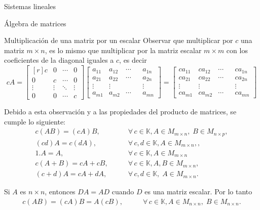 \documentclass[a4paper,12pt,twoside,spanish,reqno]{amsbook}
\theoremstyle{definition}
\theoremstyle{remark}
\newcommand{\K}{\mathbb K}
\begin{document}
\begin{chapter}{Sistemas lineales}
\begin{section}{Álgebra de matrices}
\begin{subsection}{Multiplicación de una matriz por un escalar}
        Observar que multiplicar por $c$ una matriz $m \times n$,  es lo mismo que multiplicar por la matriz escalar $m \times m$ con los coeficientes de la diagonal iguales a $c$,  es decir
        \begin{equation}
            cA = \begin{bmatrix*}[r]
            c     &     0& \cdots & 0\\
            0     &     c& \cdots & 0\\
            \vdots&\vdots&  \ddots      &\vdots\\
            0     &    0  & \cdots & c
            \end{bmatrix*}
             \begin{bmatrix}
            a_{11}&a_{12}& \cdots & & a_{1n}\\
            a_{21}&a_{22}& \cdots & &a_{2n}\\
            \vdots&\vdots&  & &\vdots\\
            a_{m1}&a_{m2}& \cdots & & a_{mn}
            \end{bmatrix} =
             \begin{bmatrix}
            ca_{11}&ca_{12}& \cdots & & ca_{1n}\\
            ca_{21}&ca_{22}& \cdots & &ca_{2n}\\
            \vdots&\vdots&  & &\vdots\\
            ca_{m1}&ca_{m2}& \cdots & & ca_{mn}
            \end{bmatrix}
        \end{equation}
        
        Debido a esta observación y a las propiedades del producto de matrices, se cumple lo siguiente:
            \begin{align*}
             c(A B) = (cA) B,\qquad &\forall\, c \in \K,  A \in M_{m \times n}, \;B \in M_{n \times p}, \\
             (cd)A = c(dA),  \qquad &\forall\, c,d \in \K,  A \in M_{m \times n},, \\
            1.A = A ,\qquad&\forall\, c \in \K, A \in M_{m \times n}\\
            c(A + B) = cA + cB,\qquad& \forall\, c \in \K, A,B \in M_{m \times n}, \\
            (c+ d)A = cA + dA,\qquad& \forall\, c,d \in \K, \; A \in M_{m \times n}.
            \end{align*}
            
            Si $A$ es $n \times n$,  entonces $DA = AD$ cuando $D$  es una matriz escalar. Por lo tanto
            \begin{align*}
            c(A B) = (cA) B = A(cB),\qquad &\forall\, c \in \K,  A \in M_{n \times n}, \;B \in M_{n \times n}.
            \end{align*} 


\end{subsection}
\end{section}
\end{chapter}
\end{document}
